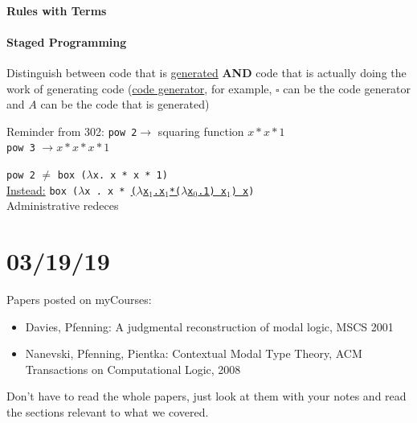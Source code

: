 \documentclass[12 pt]{article}
\begin{document}
\paragraph{Rules with Terms}
\begin{prooftree}
\end{prooftree}
\begin{prooftree}
\end{prooftree}
\paragraph{Staged Programming}
Distinguish between code that is \underline{generated} \textbf{AND} code
that is actually doing the work of generating code (\underline{code
	generator}, for example, $\square$ can be the code generator and
$A$ can be the code that is generated)

Reminder from 302: \texttt{pow 2}$\to $ squaring function $x * x * 1$
\\ \texttt{pow 3} $\to x * x * x * 1$
\begin{algorithmic}
	\Else
	\EndIf
\end{algorithmic}
\texttt{pow 2} $\neq$ \texttt{box ($\lambda$x. x * x * 1)}
\\ \underline{Instead:} \texttt{box ($\lambda$x . x *
	\underline{($\lambda$x$_1$.x$_1$*($\lambda$x$_0$.1) x$_1$) x})}
\\ Administrative redeces
\section{03/19/19}
Papers posted on myCourses:
\begin{itemize}
	\item Davies, Pfenning: A judgmental reconstruction of modal
	      logic, MSCS 2001
	\item Nanevski, Pfenning, Pientka: Contextual Modal Type
	      Theory, ACM Transactions on Computational Logic, 2008
\end{itemize}
Don't have to read the whole papers, just look at them with
your notes and read the sections relevant to what we covered.
\end{document}
